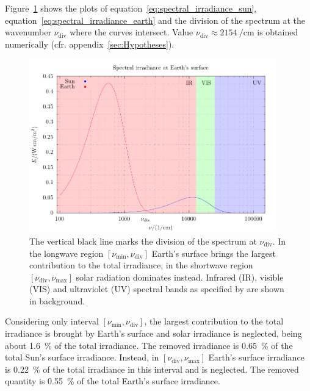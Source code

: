 \documentclass[a4paper,10pt,twocolumn,\classoptions]{article}
\begin{document}
Figure~\ref{fig:spectral_irradiance} shows the plots of equation~\eqref{eq:spectral_irradiance_sun}, equation~\eqref{eq:spectral_irradiance_earth} and the division of the spectrum at the wavenumber $\nu_\text{div}$ where the curves intersect. Value $\nu_\text{div} \approx \qty{2154}{\per\centi\metre}$ is obtained numerically (cfr. appendix~\ref{sec:Hypotheses}).
\begin{figure}[h]
  \centering
  \includegraphics*[keepaspectratio=true,width=0.95\textwidth]{spectral_irradiance_bands}
  \caption{The vertical black line marks the division of the spectrum at $\nu_\text{div}$. In the longwave region $[\nu_\text{min}, \nu_\text{div}]$ Earth's surface brings the largest contribution to the total irradiance, in the shortwave region $[\nu_\text{div}, \nu_\text{max}]$ solar radiation dominates instead. Infrared (IR), visible (VIS) and ultraviolet (UV) spectral bands as specified by \cite{CIE} are shown in background.}
  \label{fig:spectral_irradiance}
\end{figure}

Considering only interval $[\nu_\text{min}, \nu_\text{div}]$, the largest contribution to the total irradiance is brought by Earth's surface and solar irradiance is neglected, being about \qty{1.6}{\percent} of the total irradiance. The removed irradiance is \qty{0.65}{\percent} of the total Sun's surface irradiance. %
Instead, in $[\nu_\text{div}, \nu_\text{max}]$ Earth's surface irradiance is \qty{0.22}{\percent} of the total irradiance in this interval and is neglected. The removed quantity is \qty{0.55}{\percent} of the total Earth's surface irradiance. %
\end{document}
